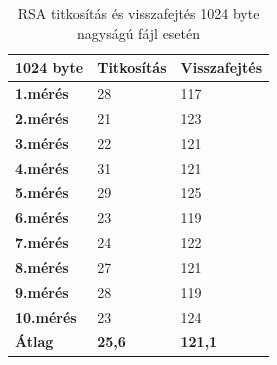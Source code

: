 \begin{table}[H]
	\centering
	\caption{RSA titkosítás és visszafejtés 1024 byte nagyságú fájl esetén}
	\label{tab:rsa_1024byte}
	\medskip
	\begin{tabular}{|p{2.4cm}|p{2.4cm}|p{2.4cm}|}
		\hline
		\textbf{1024 byte} & \textbf{Titkosítás} & \textbf{Visszafejtés}\\
		\hline
		\textbf{1.mérés} & 28 & 117\\
		\hline
		\textbf{2.mérés} & 21 & 123\\
		\hline
		\textbf{3.mérés} & 22 & 121\\
		\hline
		\textbf{4.mérés} & 31 & 121\\
		\hline
		\textbf{5.mérés} & 29 & 125\\
		\hline
		\textbf{6.mérés} & 23 & 119\\
		\hline
		\textbf{7.mérés} & 24 & 122\\
		\hline
		\textbf{8.mérés} & 27 & 121\\
		\hline
		\textbf{9.mérés} & 28 & 119\\
		\hline
		\textbf{10.mérés} & 23 & 124\\
		\hline
		\hline
		\textbf{Átlag} & \textbf{25,6} & \textbf{121,1}\\
		\hline
	\end{tabular}
\end{table}



